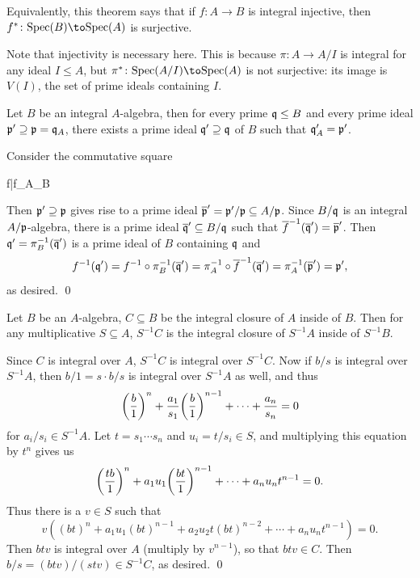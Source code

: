 \eproof

\bnote

    Equivalently, this theorem says that if $f\colon A\to B$ is integral injective, then $f^*\colon\spec(B)\to\spec(A)$ is surjective.

    Note that injectivity is necessary here.
    This is because $\pi\colon A\to A/I$ is integral for any ideal $I\leq A$, but $\pi^*\colon\spec(A/I)\to\spec(A)$ is not surjective: its image is $V(I)$, the set of prime ideals containing $I$.

\enote

\bcoro

    Let $B$ be an integral $A$-algebra, then for every prime ${{\frak q}}\leq B$ and every prime ideal ${{\frak p}}'\supseteq{{\frak p}}={{\frak q}}_A$, there exists a prime ideal ${{\frak q}}'\supseteq{{\frak q}}$ of $B$ such that ${{\frak q}}'_A={{\frak p}}'$.

\ecoro

\bproof

    Consider the commutative square

        {f}{\bar f}{\pi_A}{\pi_B} 

    Then ${{\frak p}}'\supseteq{{\frak p}}$ gives rise to a prime ideal ${\overline{{{\frak p}}}}'={{\frak p}}'/{{\frak p}}\subseteq A/{{\frak p}}$.
    Since $B/{{\frak q}}$ is an integral $A/{{\frak p}}$-algebra, there is a prime ideal ${\overline{{{\frak q}}}}'\subseteq B/{{\frak q}}$ such that ${\overline{f}}^{-1}({\overline{{{\frak q}}}}')={\overline{{{\frak p}}}}'$.
    Then ${{\frak q}}'=\pi^{-1}_B({\overline{{{\frak q}}}}')$ is a prime ideal of $B$ containing ${{\frak q}}$ and
    $$ f^{-1}({{\frak q}}') = f^{-1}\circ\pi^{-1}_B({\overline{{{\frak q}}}}') = \pi^{-1}_A\circ{\overline{f}}^{-1}({\overline{{{\frak q}}}}') = \pi^{-1}_A({\overline{{{\frak p}}}}') = {{\frak p}}' , $$
    as desired.
    \qed

\eproof

\bprop

    Let $B$ be an $A$-algebra, $C\subseteq B$ be the integral closure of $A$ inside of $B$.
    Then for any multiplicative $S\subseteq A$, $S^{-1}C$ is the integral closure of $S^{-1}A$ inside of $S^{-1}B$.

\eprop

\bproof

    Since $C$ is integral over $A$, $S^{-1}C$ is integral over $S^{-1}C$.
    Now if $b/s$ is integral over $S^{-1}A$, then $b/1=s\cdot b/s$ is integral over $S^{-1}A$ as well, and thus
    $$ \mathopen{}\mathclose{\left({{b}\over{1}}\right)}^n + {{a_1}\over{s_1}}\mathopen{}\mathclose{\left({{b}\over{1}}\right)}^{n-1} + \cdots + {{a_n}\over{s_n}} = 0 $$
    for $a_i/s_i\in S^{-1}A$.
    Let $t=s_1\cdots s_n$ and $u_i=t/s_i\in S$, and multiplying this equation by $t^n$ gives us
    $$ \mathopen{}\mathclose{\left({{tb}\over{1}}\right)}^n + a_1u_1\mathopen{}\mathclose{\left({{bt}\over{1}}\right)}^{n-1} + \cdots + a_nu_nt^{n-1} = 0 . $$
    Thus there is a $v\in S$ such that
    $$ v((bt)^n + a_1u_1(bt)^{n-1} + a_2u_2t(bt)^{n-2} + \cdots + a_nu_nt^{n-1}) = 0 . $$
    Then $btv$ is integral over $A$ (multiply by $v^{n-1}$), so that $btv\in C$.
    Then $b/s=(btv)/(stv)\in S^{-1}C$, as desired.
    \qed

